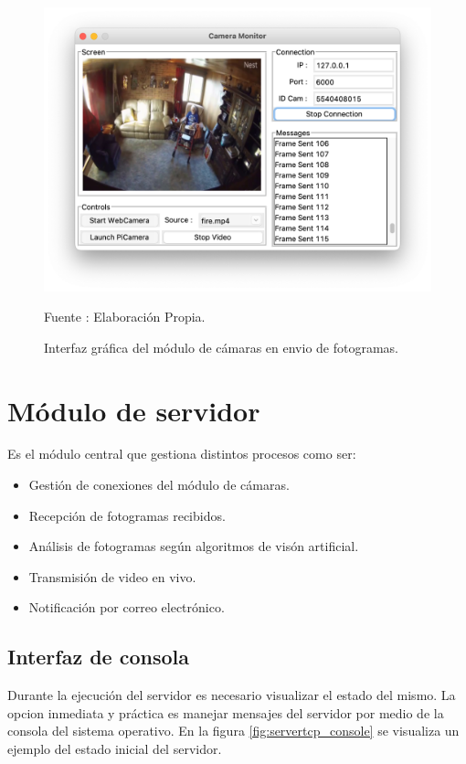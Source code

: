 \begin{figure}[H]
    \begin{center}
        \includegraphics[width=13cm]{img/capitulo_5/camera_working.png}
        \caption{Interfaz gráfica del módulo de cámaras en envio de fotogramas.}
        Fuente : Elaboración Propia.
        \label{fig:working_camera}
    \end{center}
\end{figure}


\section{Módulo de servidor}
Es el módulo central que gestiona distintos procesos como ser: 
\begin{itemize}
    \item Gestión de conexiones del módulo de cámaras.
    \item Recepción de fotogramas recibidos.
    \item Análisis de fotogramas según algoritmos de visón artificial.
    \item Transmisión de video en vivo.
    \item Notificación por correo electrónico.
\end{itemize}
\subsection{Interfaz de consola}
Durante la ejecución del servidor es necesario visualizar el estado del mismo. La opcion inmediata y práctica es manejar mensajes del servidor por medio de la consola del sistema operativo. En la figura \ref{fig:servertcp_console} se visualiza un ejemplo del estado inicial del servidor.


